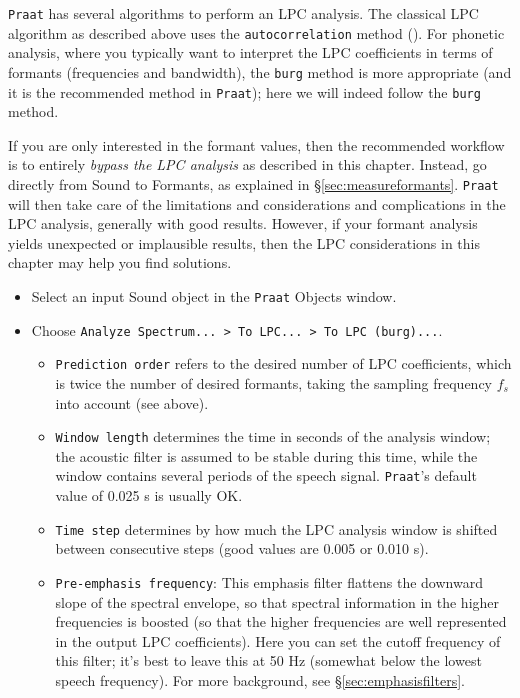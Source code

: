 \documentclass[
]{book}
\begin{document}
\texttt{Praat} has several algorithms to perform an LPC analysis. The classical LPC algorithm as described above uses the \texttt{autocorrelation} method (\citet{Markel_Gray_1976}). For phonetic analysis, where you typically want to interpret the LPC coefficients in terms of formants (frequencies and bandwidth), the \texttt{burg} method is more appropriate (and it is the recommended method in \texttt{Praat}); here we will indeed follow the \texttt{burg} method.

\protect{}\label{box:bypassLPC}
If you are only interested in the formant values, then the recommended workflow is to entirely \emph{bypass the LPC analysis} as described in this chapter. Instead, go directly from Sound to Formants, as explained in §\ref{sec:measureformants}.
\texttt{Praat} will then take care of the limitations and considerations and complications in the LPC analysis, generally with good results. However, if your formant analysis yields unexpected or implausible results, then the LPC considerations in this chapter may help you find solutions.

\protect{}\label{box-praatlpc2}
\begin{itemize}
\item
  Select an input Sound object in the \texttt{Praat} Objects window.
\item
  Choose \texttt{Analyze\ Spectrum...\ \textgreater{}\ To\ LPC...\ \textgreater{}\ To\ LPC\ (burg)...}.

  \begin{itemize}
  \item
    \texttt{Prediction\ order} refers to the desired number of LPC coefficients, which is twice the number of desired formants, taking the sampling frequency \(f_s\) into account (see above).
  \item
    \texttt{Window\ length} determines the time in seconds of the analysis window; the acoustic filter is assumed to be stable during this time, while the window contains several periods of the speech signal. \texttt{Praat}'s default value of 0.025 s is usually OK.
  \item
    \texttt{Time\ step} determines by how much the LPC analysis window is shifted between consecutive steps (good values are 0.005 or 0.010 s).
  \item
    \texttt{Pre-emphasis\ frequency}: This emphasis filter flattens the downward slope of the spectral envelope, so that spectral information in the higher frequencies is boosted (so that the higher frequencies are well represented in the output LPC coefficients). Here you can set the cutoff frequency of this filter; it's best to leave this at 50 Hz (somewhat below the lowest speech frequency). For more background, see §\ref{sec:emphasisfilters}.
  \end{itemize}
\end{itemize}
\end{document}
